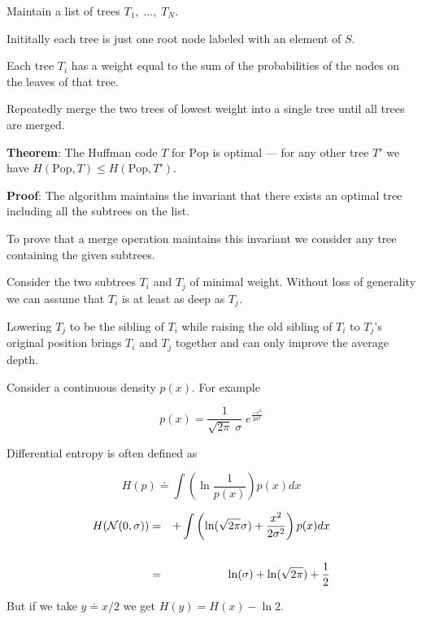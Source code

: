 {

Maintain a list of trees $T_1,\;\dots,\;T_N$.

\vfill
Inititally each tree is just one root node labeled with an element of $S$.

\vfill
Each tree $T_i$ has a weight equal to the sum of the probabilities of the nodes on the leaves of that tree.

\vfill
Repeatedly merge the two trees of lowest weight into a single tree until all trees are merged.


{\bf Theorem}: The Huffman code $T$ for $\mathrm{Pop}$ is optimal --- for any other tree $T'$ we have $H(\mathrm{Pop},T) \leq H(\mathrm{Pop},T')$.

\vfill
{\bf Proof}: The algorithm maintains the invariant that there exists an optimal tree including
all the subtrees on the list.

\vfill
To prove that a merge operation maintains this invariant we consider any tree containing the given subtrees.

\vfill
Consider the two subtrees $T_i$ and $T_j$ of minimal weight.  Without loss of generality we can assume that $T_i$ is at least as deep as $T_j$.

\vfill
Lowering $T_j$ to be the sibling of $T_i$ while raising the old sibling of $T_i$ to $T_j$'s original position
brings $T_i$ and $T_j$ together and can only improve the average depth.


Consider a continuous density $p(x)$.  For example

\vfill
$$p(x) = \frac{1}{\sqrt{2\pi}\; \sigma}\; e^{\frac{-x^2}{2\sigma^2}}$$

\vfill
Differential entropy is often defined as

\vfill
$$H(p) \doteq \int \left(\ln \frac{1}{p(x)}\right) p(x) dx$$



\begin{eqnarray*}
  H({\cal N}(0,\sigma)) & = &  + \int \left( \ln(\sqrt{2\pi} \sigma) + \frac{x^2}{2\sigma^2}\right) p(x) dx \\
  \\
  & = & \ln(\sigma) + \ln(\sqrt{2\pi}) + \frac{1}{2}
\end{eqnarray*}

\vfill
But if we take $y \doteq x/2$ we get $H(y) = H(x) - \ln 2$.

}
